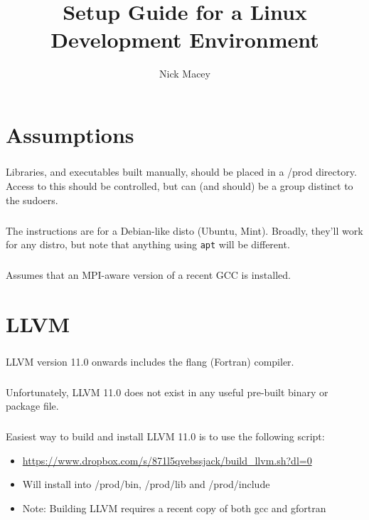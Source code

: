 \documentclass[a4paper,10pt]{report}
\title{Setup Guide for a Linux Development Environment}
\author{Nick Macey}
\begin{document}
\maketitle


\chapter{Assumptions}
\paragraph{}Libraries, and executables built manually, should be placed in a /prod directory. Access to this should be controlled, but can (and should) be a group distinct to the sudoers.
\paragraph{} The instructions are for a Debian-like disto (Ubuntu, Mint). Broadly, they'll work for any distro, but note that anything using \verb|apt| will be different.
\paragraph{} Assumes that an MPI-aware version of a recent GCC is installed.

\chapter{LLVM}
\paragraph{}LLVM version 11.0 onwards includes the flang (Fortran) compiler.
\paragraph{}Unfortunately, LLVM 11.0 does not exist in any useful pre-built binary or package file.
\paragraph{}Easiest way to build and install LLVM 11.0 is to use the following script:
    \begin{itemize}
     \item \url{https://www.dropbox.com/s/871l5qvebssjack/build_llvm.sh?dl=0}
     \item Will install into /prod/bin, /prod/lib and /prod/include
     \item Note: Building LLVM requires a recent copy of both gcc and gfortran
    \end{itemize}
\end{document}
